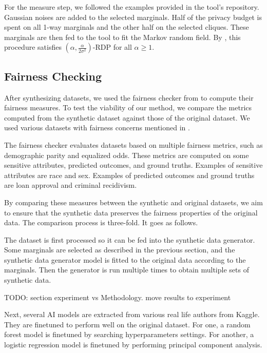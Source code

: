 \documentclass[manuscript,screen,review,anonymous]{acmart}
\begin{document}
For the measure step, we followed the examples provided in the tool's repository. Gaussian noises are added to the selected marginals. Half of the privacy budget is spent on all 1-way marginals and the other half on the selected cliques. These marginals are then fed to the tool to fit the Markov random field. By \cite{mckenna2021winning}, this procedure satisfies $(\alpha,\frac{\alpha}{2 \sigma^2})$-RDP for all $\alpha \geq 1$.

\subsection{Fairness Checking}

After synthesizing datasets, we used the fairness checker from \cite{yuan2024ensuring} to compute their fairness measures. To test the viability of our method, we compare the metrics computed from the synthetic dataset against those of the original dataset. We used various datasets with fairness concerns mentioned in \cite{pessach2022review}.

The fairness checker evaluates datasets based on multiple fairness metrics, such as demographic parity and equalized odds. These metrics are computed on some sensitive attributes, predicted outcomes, and ground truths. Examples of sensitive attributes are race and sex. Examples of predicted outcomes and ground truths are loan approval and criminal recidivism.

By comparing these measures between the synthetic and original datasets, we aim to ensure that the synthetic data preserves the fairness properties of the original data. The comparison process is three-fold. It goes as follows.

The dataset is first processed so it can be fed into the synthetic data generator. Some marginals are selected as described in the previous section, and the synthetic data generator model is fitted to the original data according to the marginals. Then the generator is run multiple times to obtain multiple sets of synthetic data.

TODO: section experiment vs Methodology. move results to experiment

Next, several AI models are extracted from various real life authors from Kaggle. They are finetuned to perform well on the original dataset. For one, a random forest model is finetuned by searching hyperparameters settings\cite{Ipbyrne2023}. For another, a logistic regression model is finetuned by performing principal component analysis\cite{Prashant1112023}.
\end{document}
